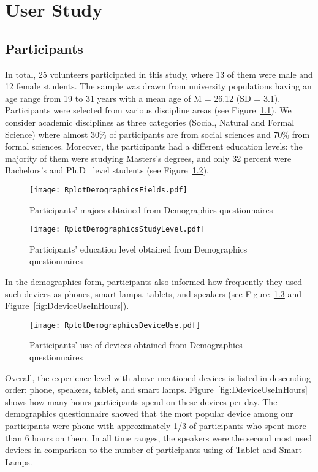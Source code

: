 \chapter{User Study}
\label{ch:user-study}

\section{Participants}
\label{sec:participants}
In total, 25 volunteers participated in this study, where 13 of them were male and 12 female students.
The sample was drawn from university populations having an age range from 19 to 31
years with a mean age of M = 26.12 (SD = 3.1).
Participants were selected from various discipline areas (see Figure~\ref{fig:Dfields}).
We consider academic disciplines as three categories (Social, Natural and Formal Science)
where almost 30\% of participants are from social sciences and 70\% from formal sciences.
Moreover, the participants had a different education levels: the majority of
them were studying Masters’s degrees, and only 32 percent were Bachelors’s
and Ph.D \ level students (see Figure~\ref{fig:DstudyLevels}).

\begin{figure}[H]
  \centering
    \texttt{[image: RplotDemographicsFields.pdf]}
      \caption{Participants' majors obtained from Demographics questionnaires}
      \label{fig:Dfields}
\end{figure}

\begin{figure}[H]
  \centering
    \texttt{[image: RplotDemographicsStudyLevel.pdf]}
      \caption{Participants' education level obtained from Demographics questionnaires}
      \label{fig:DstudyLevels}
\end{figure}

In the demographics form, participants also informed how frequently they used such devices as phones,
smart lamps, tablets, and speakers (see Figure~\ref{fig:DdeviceUse} and Figure~\ref{fig:DdeviceUseInHours}).

\begin{figure}[H]
  \centering
    \texttt{[image: RplotDemographicsDeviceUse.pdf]}
      \caption{Participants' use of devices obtained from Demographics questionnaires}
      \label{fig:DdeviceUse}
\end{figure}

Overall, the experience level with above mentioned devices is listed in
descending order: phone, speakers, tablet, and smart lamps.
Figure~\ref{fig:DdeviceUseInHours} shows how many hours participants spend on these devices per day.
The demographics questionnaire showed that the most popular device among our participants
were phone with approximately 1/3 of participants who spent more than 6 hours on them.
In all time ranges, the speakers were the second most used devices in
comparison to the number of participants using of Tablet and Smart Lamps.

